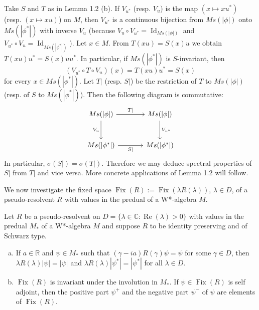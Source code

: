
\begin{remark}\label{rem:1.3}
Take $S$ and $T$ as in Lemma 1.2 (b).
If $V_{u^*}$ (resp. $V_u$) is the map $(x \mapsto xu^*)$ (resp. $(x \mapsto xu)$) on $M$, then $V_{u^*}$ is a continuous bijection from $Ms(|\phi|)$ onto $Ms(|\phi^*|)$ with inverse $V_u$ (because $V_u \circ V_{u^*} = \operatorname{Id}_{Ms(|\phi|)}$ and $V_{u^*} \circ V_u = \operatorname{Id}_{Ms(|\phi^*|)}$).
Let $x \in M$.
From $T(xu) = S(x)u$ we obtain $T(xu)u^* = S(x)uu^*$.
In particular, if $Ms(|\phi^*|)$ is $S$-invariant, then
\[
(V_{u^*} \circ T \circ V_u)(x) = T(xu)u^* = S(x)
\]
for every $x \in Ms(|\phi^*|)$.
Let $T|$ (resp. $S|$) be the restriction of $T$ to $Ms(|\phi|)$ (resp. of $S$ to $Ms(|\phi^*|)$).
Then the following diagram is commutative:
\begin{equation*}
\begin{tikzcd}[column sep=large, row sep=large, scale=1.5]
Ms(|\phi|) \arrow[r, "T|"] \arrow[d, "V_u"'] & Ms(|\phi|) \arrow[d, "V_{u^*}"] \\
Ms(|\phi^*|) \arrow[r, "S|"'] & Ms(|\phi^*|)
\end{tikzcd}
\end{equation*}
In particular, $\sigma(S|) = \sigma(T|)$.
Therefore we may deduce spectral properties of $S|$ from $T|$ and vice versa.
More concrete applications of Lemma 1.2 will follow.
\end{remark}
We now investigate the fixed space $\operatorname{Fix}(R) := \operatorname{Fix}(\lambda R(\lambda))$, $\lambda \in D$, of a pseudo-resolvent $R$ with values in the predual of a W*-algebra $M$.

\begin{proposition}\label{prop:d3-1.4}
Let $R$ be a pseudo-resolvent on $D = \{\lambda \in \mathbb{C}: \operatorname{Re}(\lambda) > 0\}$ with values in the predual $M_*$ of a W*-algebra $M$ and suppose $R$ to be identity preserving and of Schwarz type.

\begin{enumerate}[(a)]
\item 
If $a \in \mathbb{R}$ and $\psi \in M_*$ such that $(\gamma - ia)R(\gamma)\psi = \psi$ for some $\gamma \in D$, then $\lambda R(\lambda)|\psi| = |\psi|$ and $\lambda R(\lambda)|\psi^*| = |\psi^*|$ for all $\lambda \in D$.

\item 
$\operatorname{Fix}(R)$ is invariant under the involution in $M_*$.
If $\psi \in \operatorname{Fix}(R)$ is self adjoint, then the positive part $\psi^+$ and the negative part $\psi^-$ of $\psi$ are elements of $\operatorname{Fix}(R)$.
\end{enumerate}
\end{proposition}

